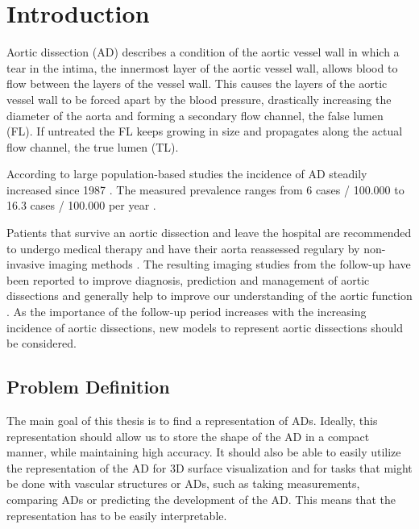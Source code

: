 \documentclass[thesis.tex]{subfiles}
\begin{document}
\chapter{Introduction}
\label{chap:introduction}
Aortic dissection (AD) describes a condition of the aortic vessel wall in which a tear in the intima, the innermost layer of the aortic vessel wall, allows blood to flow between the layers of the vessel wall. This causes the layers of the aortic vessel wall to be forced apart by the blood pressure, drastically increasing the diameter of the aorta and forming a secondary flow channel, the false lumen (FL). If untreated the FL keeps growing in size and propagates along the actual flow channel, the true lumen (TL).

According to large population-based studies the incidence of AD steadily increased since 1987 \cite{olsson2007thoracic}. The measured prevalence ranges from 6 cases / 100.000 to 16.3 cases / 100.000 per year \cite{olsson2007thoracic,goldfinger2014thoracic}. 

Patients that survive an aortic dissection and leave the hospital are recommended to undergo medical therapy and have their aorta reassessed regulary by non-invasive imaging methods \cite{olsson2007thoracic,desanctis1987aortic,baliga2014role}. The resulting imaging studies from the follow-up have been reported to improve diagnosis, prediction and management of aortic dissections \cite{doi:10.1161/CIRCULATIONAHA.117.031264} and generally help to improve our understanding of the aortic function \cite{baliga2014role}. As the importance of the follow-up period increases with the increasing incidence of aortic dissections, new models to represent aortic dissections should be considered. 


\section{Problem Definition} \label{problem_def}

The main goal of this thesis is to find a representation of ADs. Ideally, this representation should allow us to store the shape of the AD in a compact manner, while maintaining high accuracy. It should also be able to easily utilize the representation of the AD for 3D surface visualization and for tasks that might be done with vascular structures or ADs, such as taking measurements, comparing ADs or predicting the development of the AD. This means that the representation has to be easily interpretable.
\end{document}
